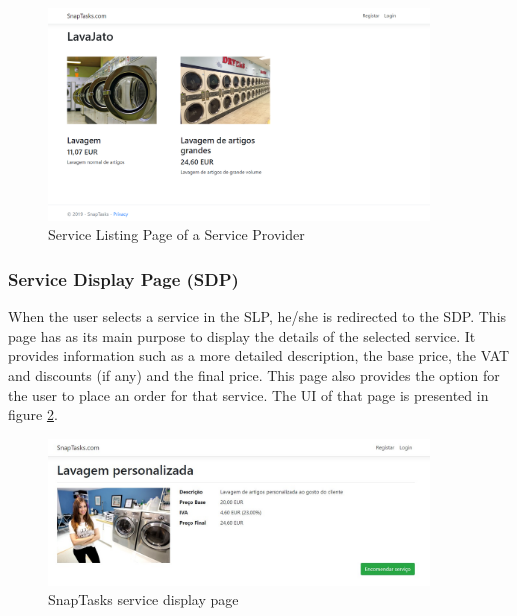 \begin{figure}[!ht]
\centering
\includegraphics[width=0.9\textwidth,keepaspectratio]{chapters/Implementation/assets/snaptasks-slp.PNG}
\caption[Service Listing Page of a Service Provider]{Service Listing Page of a Service Provider}
\label{fig:serviceListingPage}
\end{figure}


\subsubsection{Service Display Page (SDP)}
When the user selects a service in the \gls{SLP}, he/she is redirected to the \gls{SDP}. This page has as its main purpose to display the details of the selected service. It provides information such as a more detailed description, the base price, the \gls{VAT} and discounts (if any) and the final price. This page also provides the option for the user to place an order for that service. The \gls{UI} of that page is presented in figure \ref{fig:snaptasksSDP}.

\begin{figure}[ht]
\centering
\includegraphics[width=0.9\textwidth,keepaspectratio]{chapters/Implementation/assets/snaptasks-sdp.jpg}
\caption[SnapTasks service display page]{SnapTasks service display page}
\label{fig:snaptasksSDP}
\end{figure}

\clearpage

